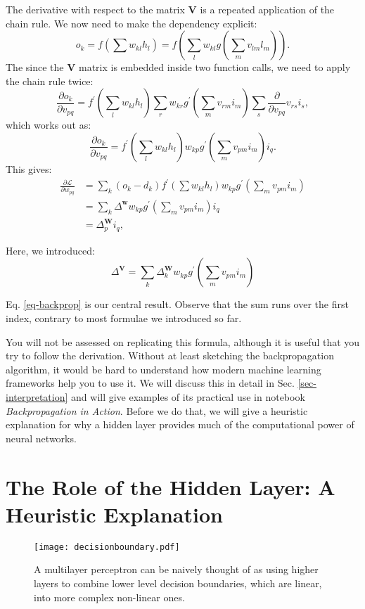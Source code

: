     The derivative with respect to the matrix $\boldsymbol{V}$ is a repeated application of the chain rule.
    We now need to make the dependency explicit:
    $$
    o_k = f(\sum w_{kl} h_l) = f(\sum_l w_{kl}g(\sum_m v_{lm} l_m)).
    $$
    The since the $\boldsymbol{V}$ matrix is embedded inside two function calls, we need to apply the chain rule twice:
    $$
    \frac{\partial o_k}{\partial v_{pq}} = f^{\prime}(\sum_l w_{kl}h_l) \sum_r w_{kr}g^{\prime}(\sum_m v_{rm} i_m) \sum_s \frac{\partial}{\partial v_{pq}} v_{rs} i_s,
    $$
    which works out as:
    $$
    \frac{\partial o_k}{\partial v_{pq}} = f^{\prime}(\sum_l w_{kl} h_l) w_{kp} g^{\prime}(\sum_m v_{pm}i_m) i_q.
    $$
    This gives:
    \begin{align}
      \frac{\partial \mathcal{L}}{\partial w_{pq}} & = \sum_k (o_k - d_k) f^{\prime}( \sum w_{kl} h_l ) w_{kp} g^{\prime}( \sum_m v_{pm} i_m)  \nonumber \\
      & = \sum_k \Delta^{\boldsymbol{w}} w_{kp} g^{\prime}(\sum_m v_{pm} i_m) i_q \nonumber \\
      & =  \Delta^{\boldsymbol{W}}_p i_q,
      \label{eq-output}
    \end{align}

    Here, we introduced:
    \begin{equation}
      \Delta^{\boldsymbol{V}} = \sum_k \Delta^{\boldsymbol{W}}_k w_{kp} g^{\prime}( \sum_m v_{pm} i_m)
      \label{eq-backprop}
   \end{equation}

    Eq. \ref{eq-backprop} is our central result. Observe that the sum runs over the first index, contrary to most formulae we introduced so far. 

    You will not be assessed on replicating this formula, although it is useful that you try to follow the derivation.
    Without at least sketching the backpropagation algorithm, it would
    be hard to understand how modern machine learning frameworks help you to use it. We will discuss this in detail in Sec. \ref{sec-interpretation} and will
    give examples of its practical use in notebook \emph{Backpropagation in Action}. Before we do that, we will give a heuristic explanation for why a hidden layer provides much
    of the computational power of neural networks.
    
    \section{The Role of the Hidden Layer: A Heuristic Explanation}
    \begin{figure}[!ht]
      \begin{center}
        \texttt{[image: decisionboundary.pdf]}
      \end{center}
      \caption{A multilayer perceptron can be naively thought of as using higher layers to combine lower level decision boundaries, which are linear, into
        more complex non-linear ones.}
      \label{fig-boundary}
    \end{figure}

